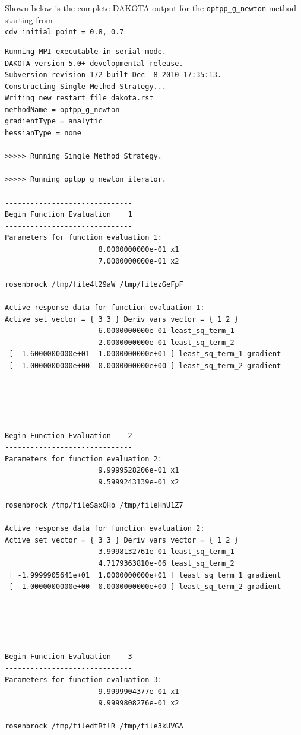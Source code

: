 Shown below is the complete DAKOTA output for the
\texttt{optpp\_g\_newton} method starting from\\
\texttt{cdv\_initial\_point = 0.8, 0.7}:
\begin{small}
\begin{verbatim}
Running MPI executable in serial mode.
DAKOTA version 5.0+ developmental release.
Subversion revision 172 built Dec  8 2010 17:35:13.
Constructing Single Method Strategy...
Writing new restart file dakota.rst
methodName = optpp_g_newton
gradientType = analytic
hessianType = none

>>>>> Running Single Method Strategy.

>>>>> Running optpp_g_newton iterator.

------------------------------
Begin Function Evaluation    1
------------------------------
Parameters for function evaluation 1:
                      8.0000000000e-01 x1
                      7.0000000000e-01 x2

rosenbrock /tmp/file4t29aW /tmp/filezGeFpF

Active response data for function evaluation 1:
Active set vector = { 3 3 } Deriv vars vector = { 1 2 }
                      6.0000000000e-01 least_sq_term_1
                      2.0000000000e-01 least_sq_term_2
 [ -1.6000000000e+01  1.0000000000e+01 ] least_sq_term_1 gradient
 [ -1.0000000000e+00  0.0000000000e+00 ] least_sq_term_2 gradient




------------------------------
Begin Function Evaluation    2
------------------------------
Parameters for function evaluation 2:
                      9.9999528206e-01 x1
                      9.5999243139e-01 x2

rosenbrock /tmp/fileSaxQHo /tmp/fileHnU1Z7

Active response data for function evaluation 2:
Active set vector = { 3 3 } Deriv vars vector = { 1 2 }
                     -3.9998132761e-01 least_sq_term_1
                      4.7179363810e-06 least_sq_term_2
 [ -1.9999905641e+01  1.0000000000e+01 ] least_sq_term_1 gradient
 [ -1.0000000000e+00  0.0000000000e+00 ] least_sq_term_2 gradient




------------------------------
Begin Function Evaluation    3
------------------------------
Parameters for function evaluation 3:
                      9.9999904377e-01 x1
                      9.9999808276e-01 x2

rosenbrock /tmp/filedtRtlR /tmp/file3kUVGA


\end{verbatim}
\end{small}
